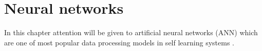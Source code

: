 \chapter{Neural networks}

In this chapter attention will be given to artificial neural networks (ANN) which are one of most 
popular data processing models in self learning systems \cite{Abiodun2019} \cite{Tran2021}
\cite{Syed2021}.
